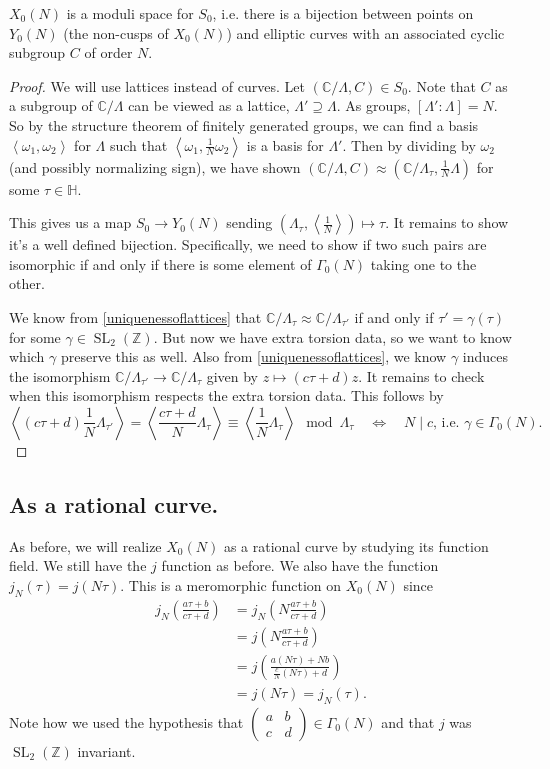 \documentclass[11pt]{article}
\newcommand{\BB}[1]{\mathbb{#1}} %
\newcommand{\free}[1]{\left\langle#1\right\rangle} %
\newcommand{\CC}{\BB{C}}
\newcommand{\ZZ}{\BB{Z}}
\newcommand{\HH}{\BB{H}}
\newcommand{\SL}{\operatorname{SL}}
\theoremstyle{plain}
\theoremstyle{remark}
\begin{document}
\begin{thm}\label{Y_0Nmoduli}
	$X_0(N)$ is a moduli space for $S_0$, i.e. there is a bijection between points on $Y_0(N)$ (the non-cusps of $X_0(N)$) and elliptic curves with an associated cyclic subgroup $C$ of order $N$.
\end{thm}
\begin{proof}
	We will use lattices instead of curves. Let $(\CC/\Lambda,C)\in S_0$. Note that $C$ as a subgroup of $\CC/\Lambda$ can be viewed as a lattice, $\Lambda'\supseteq \Lambda$. As groups, $[\Lambda':\Lambda] = N$. So by the structure theorem of finitely generated groups, we can find a basis $\free{\omega_1,\omega_2}$ for $\Lambda$ such that $\free{\omega_1,\frac{1}{N}\omega_2}$ is a basis for $\Lambda'$. Then by dividing by $\omega_2$ (and possibly normalizing sign), we have shown $(\CC/\Lambda,C) \approx \left(\CC/\Lambda_{\tau},\frac{1}{N}\Lambda\right)$ for some $\tau\in\HH$.

	This gives us a map $S_0 \to Y_0(N)$ sending $\left(\Lambda_\tau,\free{\frac{1}{N}}\right)\mapsto \tau$. It remains to show it's a well defined bijection. Specifically, we need to show if two such pairs are isomorphic if and only if there is some element of $\Gamma_0(N)$ taking one to the other.

	We know from \autoref{uniquenessoflattices} that $\CC/\Lambda_{\tau} \approx \CC/\Lambda_{\tau'}$ if and only if $\tau' = \gamma(\tau)$ for some $\gamma\in\SL_2(\ZZ)$. But now we have extra torsion data, so we want to know which $\gamma$ preserve this as well. Also from \autoref{uniquenessoflattices}, we know $\gamma$ induces the isomorphism $\CC/\Lambda_{\tau'}\to\CC/\Lambda_{\tau}$ given by $z\mapsto (c\tau+d)z$. It remains to check when this isomorphism respects the extra torsion data. This follows by
	$$
	\free{(c\tau+d)\frac{1}{N}\Lambda_{\tau'}} = \free{\frac{c\tau+d}{N}\Lambda_\tau}\equiv\free{\frac{1}{N}\Lambda_\tau}\mod{\Lambda_{\tau}}
	\quad\Leftrightarrow\quad\text{$N\mid c$, i.e. $\gamma\in\Gamma_0(N)$}.
	$$
\end{proof}

\subsection{As a rational curve.}

As before, we will realize $X_0(N)$ as a rational curve by studying its function field. We still have the $j$ function as before. We also have the function $j_N(\tau) = j(N\tau)$. This is a meromorphic function on $X_0(N)$ since
\begin{align*}
	j_N\left(\frac{a\tau+b}{c\tau+d}\right) &= j_N\left(N\frac{a\tau+b}{c\tau+d}\right)
	\\
	&=
	j\left(N\frac{a\tau+b}{c\tau+d}\right)
	\\
	&=
	j\left(\frac{a(N\tau)+Nb}{\frac{c}{N}(N\tau)+d}\right)
	\\
	&=
	j(N\tau) = j_N(\tau).
\end{align*}
Note how we used the hypothesis that $\begin{pmatrix}a&b \\ c &d\end{pmatrix}\in\Gamma_0(N)$ and that $j$ was $\SL_2(\ZZ)$ invariant.
\end{document}
